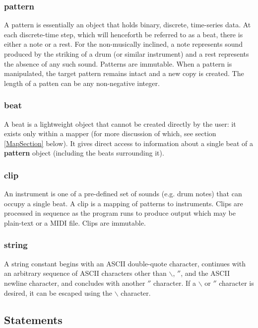 \subsubsection{pattern}

A pattern is essentially an object that holds binary, discrete, time-series data.  At each discrete-time step, which will henceforth be referred to as a beat, there is either a note or a rest.  For the non-musically inclined, a note represents sound produced by the striking of a drum (or similar instrument) and a rest represents the absence of any such sound.  Patterns are immutable.  When a pattern is manipulated, the target pattern remains intact and a new copy is created.  The length of a patten can be any non-negative integer.

\subsubsection{beat}

A beat is a lightweight object that cannot be created directly by the user: it exists only within a mapper (for more discussion of which, see section \ref{MapSection} below).  It gives direct access to information about a single beat of a \textbf{pattern} object (including the beats surrounding it).

\subsubsection{clip}

An instrument is one of a pre-defined set of sounds (e.g. drum notes) that can occupy a single beat.
A clip is a mapping of patterns to instruments. Clips are processed in sequence as the program runs to produce output which may be plain-text or a MIDI file.  Clips are immutable.

\subsubsection{string}

A string constant begins with an ASCII double-quote character, continues 
with an arbitrary sequence of ASCII characters other than $\backslash$, $''$, and the ASCII newline character, 
and concludes with another $''$ character.  If a $\backslash$ or $''$ character is 
desired, it can be escaped using the $\backslash$ character.





\subsection{Statements}


